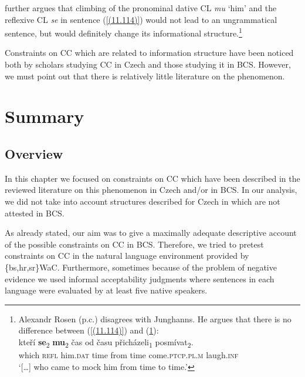\noindent \citet{Junghanns02} further argues that climbing of the pronominal dative CL \textit{mu} ‘him’ and the reflexive CL \textit{se} in sentence (\ref{(11.114)}) would not lead to an ungrammatical sentence, but would definitely change its informational structure.\footnote{Alexandr
    Rosen (p.c.) disagrees with Junghanns. He argues that there is no difference between (\ref{(11.114)}) and (\ref{(11.114a)}):\\

    \ea\label{(11.114a)}
    \gll [\dots] kteří \textbf{se}\textsubscript{2} \textbf{mu}\textsubscript{2} čas od času přicházeli\textsubscript{1} posmívat\textsubscript{2}. \\
        {} which \textsc{refl} him\textsc{.dat} time from time come\textsc{.ptcp.pl.m} laugh\textsc{.inf}\\
        \glt ‘[\dots] who came to mock him from time to time.’
    \z
}

Constraints on CC which are related to information structure have been noticed both by scholars studying CC in Czech and those studying it in BCS. However, we must point out that there is relatively little literature on the phenomenon. 

\section{Summary}
\label{Summary:Czech}
\subsection{Overview}

In this chapter we focused on constraints on CC which have been described in the reviewed literature on this phenomenon in Czech and/or in BCS. In our analysis, we did not take into account structures described for Czech in \citet{Junghanns02} which are not attested in BCS. 

As already stated, our aim was to give a maximally adequate descriptive account of the possible constraints on CC in BCS. Therefore, we tried to pretest constraints on CC in the natural language environment provided by \{bs,hr,sr\}WaC. Furthermore, sometimes because of the problem of negative evidence we used informal acceptability judgments where sentences in each language were evaluated by at least five native speakers. 


